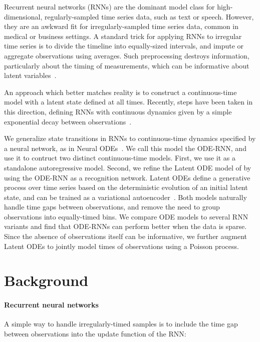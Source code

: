 \documentclass{article}
\begin{document}
Recurrent neural networks (RNNs) are the dominant model class for high-dimensional, regularly-sampled time series data, such as text or speech.
However, they are an awkward fit for irregularly-sampled time series data, common in medical or business settings. A standard trick for applying RNNs to irregular time series is to divide the timeline into equally-sized intervals, and impute or aggregate observations using averages.
Such preprocessing destroys information, particularly about the timing of measurements, which can be informative about latent variables~\citep{pmlr_Lipton16, che_sontag_2018}.


An approach which better matches reality is to construct a continuous-time model with a latent state defined at all times.
Recently, steps have been taken in this direction, defining RNNs with continuous dynamics given by a simple exponential decay between observations~\citep{che_sontag_2018, BRITS_2018, google_ehr_2018, neural_hawkes}.


We generalize state transitions in RNNs to continuous-time dynamics specified by a neural network, as in Neural ODEs~\citep{NeuralODE}.
We call this model the ODE-RNN, and use it to contruct two distinct continuous-time models.
First, we use it as a standalone autoregressive model.
Second, we refine the Latent ODE model of \citet{NeuralODE} by using the ODE-RNN as a recognition network.
Latent ODEs define a generative process over time series based on the deterministic evolution of an initial latent state, and can be trained as a variational autoencoder~\citep{kingma2013auto}.
Both models naturally handle time gaps between observations, and remove the need to group observations into equally-timed bins. We compare ODE models to several RNN variants and find that ODE-RNNs can perform better when the data is sparse.
Since the absence of observations itself can be informative, we further augment Latent ODEs to jointly model times of observations using a Poisson process.






\section{Background}
\paragraph{Recurrent neural networks}
A simple way to handle irregularly-timed samples is to include the time gap between observations  into the update function of the RNN:
\end{document}
